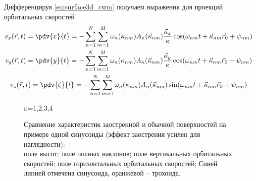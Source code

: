 Дифференцируя \eqref{eq:surface3d_cwm} получаем выражения для
проекций орбитальных
скоростей 
\begin{equation}
    \begin{gathered}
        \label{eq:orbital_velocity}
        v_x(\vec r, t)  = \pdv{x}{t} = - \fullsum \omega_n(\kappa_{nm}) A_n(\vec
        \kappa_{nm}) \frac{\vec \kappa_x}{\kappa} \cos(\fullphase) \\
        v_y (\vec r, t) = \pdv{y}{t} = - \fullsum \omega_n(\kappa_{nm}) A_n(\vec
        \kappa_{nm}) \frac{\vec \kappa_y}{\kappa}\cos(\fullphase) \\
        v_z (\vec r, t) = \pdv{\zeta}{t} = - \fullsum \omega_n(\kappa_{nm})
        A_n(\vec \kappa_{nm})
        \sin(\fullphase)
    \end{gathered}
\end{equation}




\begin{figure}[H]
\centering
\makeatletter
    \@for\i:={1,2,3,4}

\label{fig:cwm_demo}
\caption{
    Сравнение характеристик заостренной и обычной поверхностей на примере одной
    синусоиды (эффект заострения усилен для наглядности): \\
     поле высот;
     поле полных наклонов;
     поле вертикальных орбитальных скоростей;
     поле горизонтальных орбитальных скоростей;
    Синей линией отмечена синусоида, оранжевой -- трохоида.
}
\makeatother
\end{figure}




